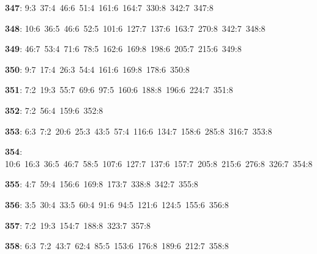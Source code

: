 \noindent \textbf{347}: 9:3\allowbreak\ 37:4\allowbreak\ 46:6\allowbreak\ 51:4\allowbreak\ 161:6\allowbreak\ 164:7\allowbreak\ 330:8\allowbreak\ 342:7\allowbreak\ 347:8\par
\noindent \textbf{348}: 10:6\allowbreak\ 36:5\allowbreak\ 46:6\allowbreak\ 52:5\allowbreak\ 101:6\allowbreak\ 127:7\allowbreak\ 137:6\allowbreak\ 163:7\allowbreak\ 270:8\allowbreak\ 342:7\allowbreak\ 348:8\par
\noindent \textbf{349}: 46:7\allowbreak\ 53:4\allowbreak\ 71:6\allowbreak\ 78:5\allowbreak\ 162:6\allowbreak\ 169:8\allowbreak\ 198:6\allowbreak\ 205:7\allowbreak\ 215:6\allowbreak\ 349:8\par
\noindent \textbf{350}: 9:7\allowbreak\ 17:4\allowbreak\ 26:3\allowbreak\ 54:4\allowbreak\ 161:6\allowbreak\ 169:8\allowbreak\ 178:6\allowbreak\ 350:8\par
\noindent \textbf{351}: 7:2\allowbreak\ 19:3\allowbreak\ 55:7\allowbreak\ 69:6\allowbreak\ 97:5\allowbreak\ 160:6\allowbreak\ 188:8\allowbreak\ 196:6\allowbreak\ 224:7\allowbreak\ 351:8\par
\noindent \textbf{352}: 7:2\allowbreak\ 56:4\allowbreak\ 159:6\allowbreak\ 352:8\par
\noindent \textbf{353}: 6:3\allowbreak\ 7:2\allowbreak\ 20:6\allowbreak\ 25:3\allowbreak\ 43:5\allowbreak\ 57:4\allowbreak\ 116:6\allowbreak\ 134:7\allowbreak\ 158:6\allowbreak\ 285:8\allowbreak\ 316:7\allowbreak\ 353:8\par
\noindent \textbf{354}: 10:6\allowbreak\ 16:3\allowbreak\ 36:5\allowbreak\ 46:7\allowbreak\ 58:5\allowbreak\ 107:6\allowbreak\ 127:7\allowbreak\ 137:6\allowbreak\ 157:7\allowbreak\ 205:8\allowbreak\ 215:6\allowbreak\ 276:8\allowbreak\ 326:7\allowbreak\ 354:8\par
\noindent \textbf{355}: 4:7\allowbreak\ 59:4\allowbreak\ 156:6\allowbreak\ 169:8\allowbreak\ 173:7\allowbreak\ 338:8\allowbreak\ 342:7\allowbreak\ 355:8\par
\noindent \textbf{356}: 3:5\allowbreak\ 30:4\allowbreak\ 33:5\allowbreak\ 60:4\allowbreak\ 91:6\allowbreak\ 94:5\allowbreak\ 121:6\allowbreak\ 124:5\allowbreak\ 155:6\allowbreak\ 356:8\par
\noindent \textbf{357}: 7:2\allowbreak\ 19:3\allowbreak\ 154:7\allowbreak\ 188:8\allowbreak\ 323:7\allowbreak\ 357:8\par
\noindent \textbf{358}: 6:3\allowbreak\ 7:2\allowbreak\ 43:7\allowbreak\ 62:4\allowbreak\ 85:5\allowbreak\ 153:6\allowbreak\ 176:8\allowbreak\ 189:6\allowbreak\ 212:7\allowbreak\ 358:8\par
